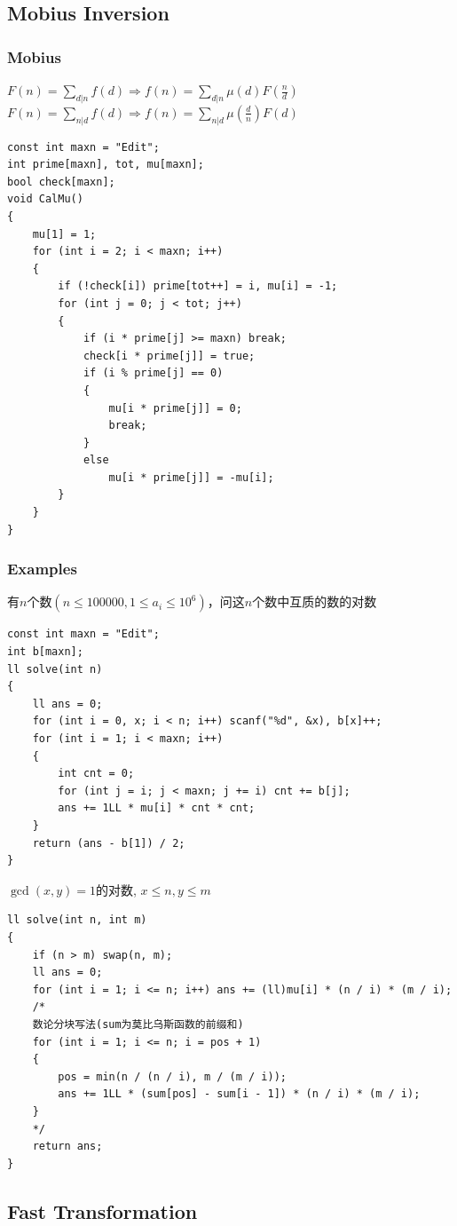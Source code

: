 \documentclass[twoside]{article}
\begin{document}
\subsection{Mobius Inversion}
\subsubsection{Mobius}

$F(n)=\sum_{d|n}f(d)\Rightarrow f(n)=\sum_{d|n}\mu(d)F(\frac{n}{d})$\\
$F(n)=\sum_{n|d}f(d)\Rightarrow f(n)=\sum_{n|d}\mu(\frac{d}{n})F(d)$
\begin{lstlisting}
const int maxn = "Edit";
int prime[maxn], tot, mu[maxn];
bool check[maxn];
void CalMu()
{
    mu[1] = 1;
    for (int i = 2; i < maxn; i++)
    {
        if (!check[i]) prime[tot++] = i, mu[i] = -1;
        for (int j = 0; j < tot; j++)
        {
            if (i * prime[j] >= maxn) break;
            check[i * prime[j]] = true;
            if (i % prime[j] == 0)
            {
                mu[i * prime[j]] = 0;
                break;
            }
            else
                mu[i * prime[j]] = -mu[i];
        }
    }
}
\end{lstlisting}
\subsubsection{Examples}

有$n$个数$(n \leq 100000,1 \le  a_i \le 10 ^ 6)$，问这$n$个数中互质的数的对数
\begin{lstlisting}
const int maxn = "Edit";
int b[maxn];
ll solve(int n)
{
    ll ans = 0;
    for (int i = 0, x; i < n; i++) scanf("%d", &x), b[x]++;
    for (int i = 1; i < maxn; i++)
    {
        int cnt = 0;
        for (int j = i; j < maxn; j += i) cnt += b[j];
        ans += 1LL * mu[i] * cnt * cnt;
    }
    return (ans - b[1]) / 2;
}
\end{lstlisting}
$\gcd(x,y)=1$的对数, $x \leq n, y \leq m$
\begin{lstlisting}
ll solve(int n, int m)
{
    if (n > m) swap(n, m);
    ll ans = 0;
    for (int i = 1; i <= n; i++) ans += (ll)mu[i] * (n / i) * (m / i);
    /* 
    数论分块写法(sum为莫比乌斯函数的前缀和)
    for (int i = 1; i <= n; i = pos + 1)
    {
        pos = min(n / (n / i), m / (m / i));
        ans += 1LL * (sum[pos] - sum[i - 1]) * (n / i) * (m / i);
    }
    */
    return ans;
}

\end{lstlisting}
\subsection{Fast Transformation}
\end{document}
